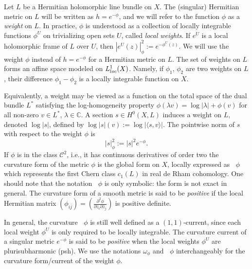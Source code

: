 \documentclass[a4paper, 11pt]{amsart}
\theoremstyle{plain}
\numberwithin{equation}{section} %
\numberwithin{figure}{section} %
\theoremstyle{plain}
\theoremstyle{plain}
\theoremstyle{plain}
\theoremstyle{plain}
\theoremstyle{remark}
\theoremstyle{definition}
\theoremstyle{definition}
\DeclareMathOperator \ddc{\textrm{dd}^c}
\begin{document}

Let $L$ be a Hermitian holomorphic line bundle on $X$. The (singular) Hermitian metric on $L$ will be written as $h=e^{-\phi}$, and we will refer to the function $\phi$ as a {\em weight} on $L$. In practice, $\phi$ is understood as a collection of locally integrable functions $\phi^U$ on trivializing open sets $U$, called {\em local weights}. If $e^U$ is a local holomorphic frame of $L$ over $U$, then $|e^U(z)|_\phi^2 := e^{-\phi^U(z)}$.  We will use the weight $\phi$ instead of $h=e^{-\phi}$ for a Hermitian metric on $L$.
The set of weights on $L$ forms an affine space modeled on $L^1_{\rm loc}(X)$. Namely, if $\phi_1$, $\phi_2$ are two weights on $L$, their difference $\phi_1-\phi_2$ is a locally integrable function on $X$.

 Equivalently, a weight may be viewed as a function on the total space of the dual bundle $L^*$ satisfying the log‑homogeneity property $\phi(\lambda v)=\log|\lambda|+\phi(v)$ for all non-zero $v\in L^*$, $\lambda\in\mathbb{C}$. 
 A section $s \in H^0(X,L)$ induces a weight on $L$, denoted $\log|s|$, defined by $\log|s|(v) := \log |\langle s, v\rangle|$.
The pointwise norm of $s$ with respect to the weight $\phi$ is \[ |s|^2_\phi:=|s|^2e^{-\phi}.\]
If $\phi$ is in the class $\mathcal{C}^2$, i.e., it has continuous derivatives of order two the curvature form of the metric $\phi$ is the global form on $X$, locally expressed as $\ddc\phi$ which represents the first Chern class $c_1(L)$ in real de Rham cohomology.  One should note that the notation $\ddc\phi$ is only symbolic: the form is not exact in general. The curvature form of a smooth metric is said to be {\em positive} if the local Hermitian matrix $(\phi_{i\bar j}) = \left(\frac{\partial^2 \phi}{\partial z_i \partial \bar z_j}\right)$ is positive definite.


In general, the curvature $\ddc\phi$ is still well defined as a $(1,1)$‑current, since each local weight $\phi^U$ is only required to be locally integrable. The curvature current of a singular metric $e^{-\phi}$ is said to be {\em positive} when the local weights $\phi^U$ are plurisubharmonic (psh).  We use the notations $\omega_\phi$ and $\ddc\phi$ interchangeably for the curvature form/current of the weight $\phi$.
\end{document}
